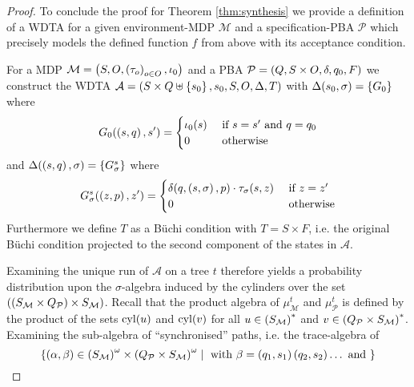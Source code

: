 \begin{proof}
To conclude the proof for Theorem \ref{thm:synthesis} we provide a definition
of a \ac{WDTA} for a given environment-\ac{MDP} $\mathcal{M}$ and a
specification-\ac{PBA} $\mathcal{P}$ which precisely models the defined
function $f$ from above with its acceptance condition.
\begin{definition}
  For a \ac{MDP} $\mathcal{M} = \left(S, O, \left(\tau_{o}\right)_{o\in O},
  \iota_{0}\right)$ and a \ac{PBA} $\mathcal{P} = \left(Q, S\times O, \delta, q_{0},
  F\right)$ we construct the \ac{WDTA}
  $\mathcal{A} = \left(S\times Q\uplus\left\{s_{0}\right\}, s_{0}, S, O, \Delta,
  T\right)$ with $\Delta(s_{0}, \sigma) = \left\{G_{0}\right\}$ where
  \begin{equation*}
    G_{0}(\left(s,q\right), s') =
    \begin{cases}
      \iota_{0}(s)&\text{ if }s = s'\text{ and }q = q_{0}\\
      0 &\text{ otherwise}
    \end{cases}
  \end{equation*}
  and $\Delta(\left(s, q\right), \sigma) = \left\{G^{s}_{\sigma}\right\}$ where
  \begin{equation*}
    G^{s}_{\sigma}(\left(z,p\right), z') =
    \begin{cases}
      \delta(q, \left(s,\sigma\right), p)\cdot\tau_{\sigma}(s,z)&\text{ if }z = z'\\
      0 &\text{ otherwise}
    \end{cases}
  \end{equation*}
  Furthermore we define $T$ as a Büchi condition with $T = S\times F$, i.e. the
  original Büchi condition projected to the second component of the
  states in $\mathcal{A}$.
\end{definition}
Examining the unique run of $\mathcal{A}$ on a tree $t$ therefore yields a
probability distribution upon the $\sigma$-algebra induced by the cylinders
over the set $\left(\left(S_{\mathcal{M}}\times Q_{\mathcal{P}}\right)\times
S_{\mathcal{M}}\right)$. Recall that the product algebra of
$\mu_{\mathcal{M}}^{t}$ and $\mu_{\mathcal{P}}^{t}$ is defined by the product
of the sets $\operatorname{cyl}(u)$ and $\operatorname{cyl}(v)$ for all $u\in\left(S_{\mathcal{M}}\right)^{*}$
and $v\in\left(Q_{\mathcal{P}}\times S_{\mathcal{M}}\right)^{*}$. Examining the
sub-algebra of \enquote{synchronised} paths, i.e. the trace-algebra of
\begin{equation*}
  \left\{\left(\alpha,\beta\right)\in \left(S_{\mathcal{M}}\right)^{\omega}\times
  \left(Q_{\mathcal{P}}\times S_{\mathcal{M}}\right)^{\omega}\mid\text{ with }
  \beta = \left(q_{1}, s_{1}\right)\left(q_{2}, s_{2}\right)\dots\text{ and }
\right\}
\end{equation*}
\end{proof}
